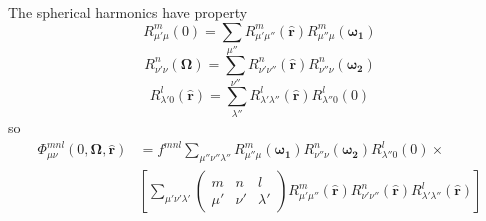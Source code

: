 The spherical harmonics have property \citep{Edmonds,Messiah}
\begin{equation}
R_{\mu'\mu}^{m}(0)=\sum_{\mu''}R_{\mu'\mu''}^{m}(\mathbf{\hat{r}})R_{\mu''\mu}^{m}(\boldsymbol{\omega_{1}})
\end{equation}
\begin{equation}
R_{\nu'\nu}^{n}(\mathbf{\Omega})=\sum_{\nu''}R_{\nu'\nu''}^{n}(\mathbf{\hat{r}})R_{\nu''\nu}^{n}(\boldsymbol{\omega_{2}})
\end{equation}
\begin{equation}
R_{\lambda'0}^{l}(\mathbf{\hat{r}})=\sum_{\lambda''}R_{\lambda'\lambda''}^{l}(\mathbf{\hat{r}})R_{\lambda''0}^{l}(0)
\end{equation}
so
\begin{align}
\Phi_{\mu\nu}^{mnl}(0,\mathbf{\Omega},\mathbf{\hat{r}}) & =f^{mnl}\sum_{\mu''\nu''\lambda''}R_{\mu''\mu}^{m}(\boldsymbol{\omega_{1}})R_{\nu''\nu}^{n}(\boldsymbol{\omega_{2}})R_{\lambda''0}^{l}(0)\times\nonumber \\
 & \left[\sum_{\mu'\nu'\lambda'}\left(\begin{array}{ccc}
m & n & l\\
\mu' & \nu' & \lambda'
\end{array}\right)R_{\mu'\mu''}^{m}(\mathbf{\hat{r}})R_{\nu'\nu''}^{n}(\mathbf{\hat{r}})R_{\lambda'\lambda''}^{l}(\mathbf{\hat{r}})\right]
\end{align}


